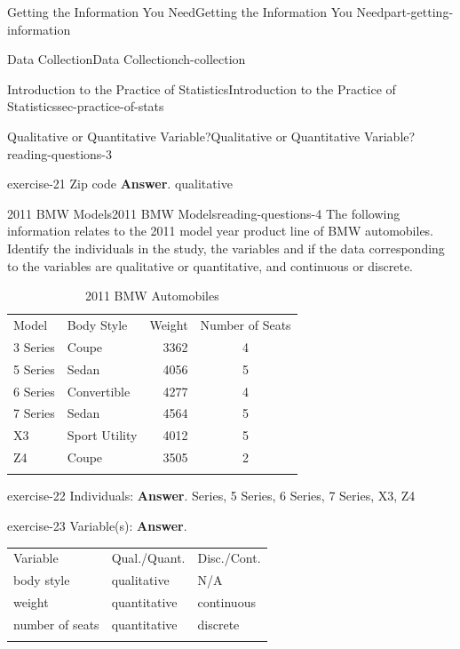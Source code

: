 \documentclass[oneside,10pt,]{book}
\numberwithin{equation}{section}
\newcommand{\hrulemedium}{\noalign{\hrule height 0.07em}}
\newcommand{\hrulethick} {\noalign{\hrule height 0.11em}}
\begin{document}
\begin{partptx}{Getting the Information You Need}{}{Getting the Information You Need}{}{}{part-getting-information}
\begin{chapterptx}{Data Collection}{}{Data Collection}{}{}{ch-collection}
\begin{sectionptx}{Introduction to the Practice of Statistics}{}{Introduction to the Practice of Statistics}{}{}{sec-practice-of-stats}
\begin{reading-questions-subsection-numberless}{Qualitative or Quantitative Variable?}{}{Qualitative or Quantitative Variable?}{}{}{reading-questions-3}
\begin{divisionexercise}{9}{}{}{exercise-21}%
Zip code \textbf{Answer}.\hypertarget{answer-21}{}\quad%
qualitative\end{divisionexercise}%
\end{reading-questions-subsection-numberless}
%
%
\typeout{************************************************}
\typeout{************************************************}
%
\begin{reading-questions-subsection-numberless}{2011 BMW Models}{}{2011 BMW Models}{}{}{reading-questions-4}
\hypertarget{p-4}{}%
The following information relates to the 2011 model year product line of BMW automobiles. Identify the individuals in the study, the variables and if the data corresponding to the variables are qualitative or quantitative, and continuous or discrete.%
\begin{table}
\centering
\begin{tabular}{llll}\hrulethick
Model&Body Style&Weight&Number of Seats\tabularnewline\hrulemedium
3 Series&Coupe&\multicolumn{1}{r}{3362}&\multicolumn{1}{c}{4}\tabularnewline[0pt]
5 Series&Sedan&\multicolumn{1}{r}{4056}&\multicolumn{1}{c}{5}\tabularnewline[0pt]
6 Series&Convertible&\multicolumn{1}{r}{4277}&\multicolumn{1}{c}{4}\tabularnewline[0pt]
7 Series&Sedan&\multicolumn{1}{r}{4564}&\multicolumn{1}{c}{5}\tabularnewline[0pt]
X3&Sport Utility&\multicolumn{1}{r}{4012}&\multicolumn{1}{c}{5}\tabularnewline[0pt]
Z4&Coupe&\multicolumn{1}{r}{3505}&\multicolumn{1}{c}{2}\tabularnewline\hrulethick
\end{tabular}
\caption{2011 BMW Automobiles\label{table-1}}
\end{table}
\begin{divisionexercise}{1}{}{}{exercise-22}%
Individuals: \textbf{Answer}.\hypertarget{answer-22}{} Series, 5 Series, 6 Series, 7 Series, X3, Z4\end{divisionexercise}%
\begin{divisionexercise}{2}{}{}{exercise-23}%
Variable(s): \textbf{Answer}.\hypertarget{answer-23}{}\quad%
\begin{tabular}{lll}\hrulethick
Variable&Qual.\slash{}Quant.&Disc.\slash{}Cont.\tabularnewline\hrulemedium
body style&qualitative&N\slash{}A\tabularnewline[0pt]
weight&quantitative&continuous\tabularnewline[0pt]
number of seats&quantitative&discrete\tabularnewline\hrulethick
\end{tabular}
\end{divisionexercise}%
\end{reading-questions-subsection-numberless}

\end{sectionptx}
\end{chapterptx}
\end{partptx}
\end{document}
